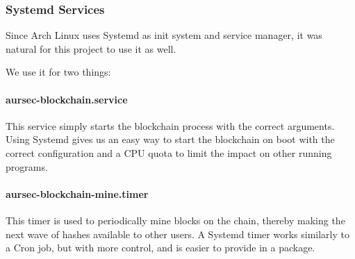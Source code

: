 \subsubsection{Systemd Services}
Since Arch Linux uses Systemd as init system and service manager, it was natural for this project to use it as well.

We use it for two things:

\paragraph*{aursec-blockchain.service} This service simply starts the blockchain process with the correct arguments. Using Systemd gives us an easy way to start the blockchain on boot with the correct configuration and a CPU quota to limit the impact on other running programs.

\paragraph*{aursec-blockchain-mine.timer} This timer is used to periodically mine blocks on the chain, thereby making the next wave of hashes available to other users. A Systemd timer works similarly to a Cron job, but with more control, and is easier to provide in a package.
